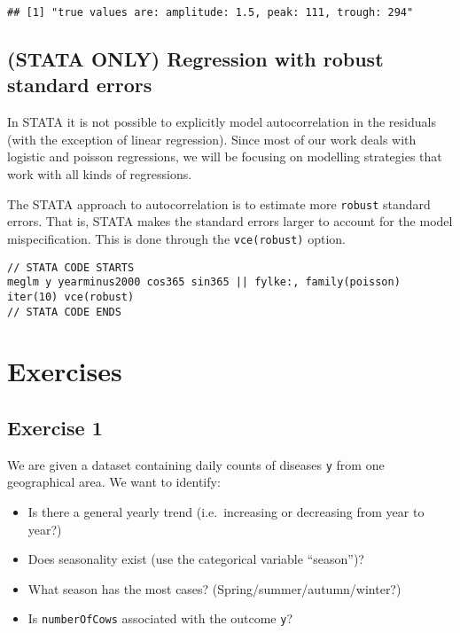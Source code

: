 \documentclass[]{book}
\providecommand{\tightlist}{%
  \setlength{\itemsep}{0pt}\setlength{\parskip}{0pt}}
\begin{document}
\begin{verbatim}
## [1] "true values are: amplitude: 1.5, peak: 111, trough: 294"
\end{verbatim}

\newpage

\section{(STATA ONLY) Regression with robust standard
errors}\label{stata-only-regression-with-robust-standard-errors-1}

In STATA it is not possible to explicitly model autocorrelation in the
residuals (with the exception of linear regression). Since most of our
work deals with logistic and poisson regressions, we will be focusing on
modelling strategies that work with all kinds of regressions.

The STATA approach to autocorrelation is to estimate more
\texttt{robust} standard errors. That is, STATA makes the standard
errors larger to account for the model mispecification. This is done
through the \texttt{vce(robust)} option.

\begin{verbatim}
// STATA CODE STARTS
meglm y yearminus2000 cos365 sin365 || fylke:, family(poisson) iter(10) vce(robust)
// STATA CODE ENDS
\end{verbatim}

\chapter{Exercises}\label{exercises}

\section{Exercise 1}\label{exercise-1}

We are given a dataset containing daily counts of diseases \texttt{y}
from one geographical area. We want to identify:

\begin{itemize}
\tightlist
\item
  Is there a general yearly trend (i.e.~increasing or decreasing from
  year to year?)
\item
  Does seasonality exist (use the categorical variable ``season'')?
\item
  What season has the most cases? (Spring/summer/autumn/winter?)
\item
  Is \texttt{numberOfCows} associated with the outcome \texttt{y}?
\end{itemize}
\end{document}
